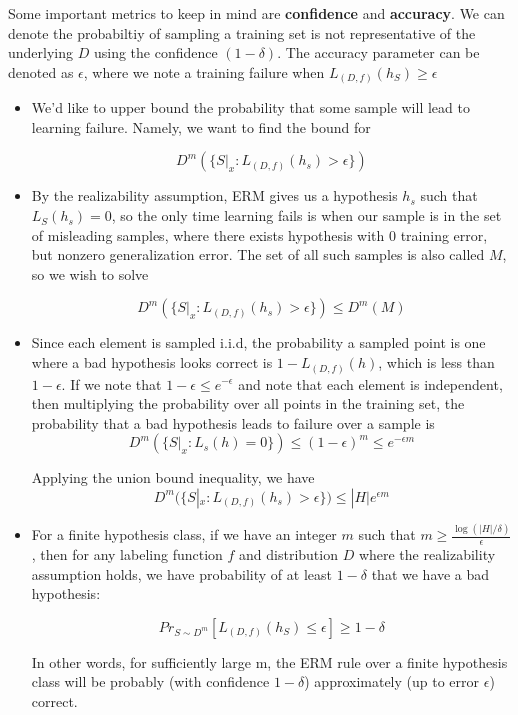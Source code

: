 \documentclass[11pt]{article}
\begin{document}
\noindent Some important metrics to keep in mind are \textbf{confidence} and \textbf{accuracy}. We can denote the probabiltiy of sampling a training set is not 
representative of the underlying \( D \) using the confidence \( (1 - \delta) \). The accuracy parameter can be denoted as \( \epsilon \), where we note a training failure
when \( L_{(D,f)}(h_{S}) \geq \epsilon \)

\begin{itemize}
    \item We'd like to upper bound the probability that some sample will lead to learning failure. Namely, we want to find the bound for
    
    \[ 
        D^{m}(\{S|_{x} \colon L_{(D,f)}(h_{s}) > \epsilon\} ) 
    \]
    \item By the realizability assumption, ERM gives us a hypothesis \( h_{s} \) such that \( L_{S}(h_{s}) = 0\), so the only time learning fails is when 
    our sample is in the set of misleading samples, where there exists hypothesis with 0 training error, but nonzero generalization error. The set of all such samples is also called \( M \), so
    we wish to solve 
    
    \[ 
        D^{m}(\{S|_{x} \colon L_{(D,f)}(h_{s}) > \epsilon\} )  \leq D^{m}(M)
    \]

    \item Since each element is sampled i.i.d, the probability a sampled point is one where a bad hypothesis looks correct is \( 1 - L_{(D,f)}(h) \), which is less than \( 1 - \epsilon \). If we note
    that \( 1 - \epsilon \leq e^{-\epsilon} \) and note that each element is independent, then multiplying the probability over all points in the training set, the probability that a bad hypothesis leads to failure
    over a sample is 
    \[ 
        D^{m}(\{S|_{x} \colon L_{s}(h) = 0\}) \leq (1-\epsilon)^{m} \leq e^{-\epsilon m} 
    \]

    Applying the union bound inequality, we have 
    \[ 
        D^{m}(\{S|_{x} \colon L_{(D,f)}(h_{s}) > \epsilon\} ) \leq |H|e^{\epsilon m}
    \]

    \item For a finite hypothesis class, if we have an integer \( m \) such that \( m\geq\frac{\log{\left( |H|/\delta \right)}}{\epsilon} \), then for any labeling function \( f \) and distribution \( D \)
    where the realizability assumption holds, we have probability of at least \( 1 - \delta \) that we have a bad hypothesis:
    
    \[ 
        Pr_{S\sim D^{m}}[L_{(D,f)}(h_{S}) \leq \epsilon] \geq 1-\delta 
    \]

    In other words, for sufficiently large m, the ERM rule over a finite hypothesis class will be probably (with confidence \( 1-\delta \)) approximately (up to error \( \epsilon \)) correct.

\end{itemize}
\end{document}
